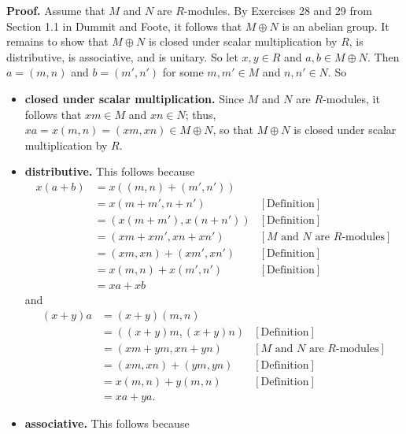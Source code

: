 \documentclass[9pt]{article}
\begin{document}
\begin{enumerate}
      \textbf{Proof.} Assume that $M$ and $N$ are $R$-modules. By Exercises 28
      and 29 from Section 1.1 in Dummit and Foote, it follows that $M \oplus N$
      is an abelian group. It remains to show that $M \oplus N$ is closed under
      scalar multiplication by $R$, is distributive, is associative, and is
      unitary. So let $x, y \in R$ and $a, b \in M \oplus N$. Then $a = (m, n)$
      and $b = (m', n')$ for some $m, m' \in M$ and $n, n' \in N$. So 
      \begin{itemize}
         \item \textbf{closed under scalar multiplication.} Since $M$ and $N$
               are $R$-modules, it follows that $xm \in M$ and $xn \in N$; thus,
               $xa = x(m, n) = (xm, xn) \in M \oplus N$, so that $M \oplus N$
               is closed under scalar multiplication by $R$.
         \item \textbf{distributive.} This follows because
               \begin{align*}
                  x(a + b) &= x((m, n) + (m', n')) \\
                     &= x(m + m', n + n') &[\text{Definition}] \\
                     &= (x(m + m'), x(n + n')) &[\text{Definition}] \\
                     &= (xm + xm', xn + xn')
                        &[M\text{ and }N \text{ are } R\text{-modules}] \\
                     &= (xm, xn) + (xm', xn') &[\text{Definition}] \\
                     &= x(m, n) + x(m', n') &[\text{Definition}] \\
                     &= xa + xb
               \end{align*}
               and
               \begin{align*}
                  (x + y)a &= (x + y)(m, n) \\
                     &= ((x + y)m, (x + y)n) &[\text{Definition}] \\
                     &= (xm + ym, xn + yn)
                        &[M\text{ and }N \text{ are } R\text{-modules}] \\
                     &= (xm, xn) + (ym, yn) &[\text{Definition}] \\
                     &= x(m, n) + y(m, n) &[\text{Definition}] \\
                     &= xa + ya.
               \end{align*}
         \item \textbf{associative.} This follows because

\end{itemize}
\end{enumerate}
\end{document}
